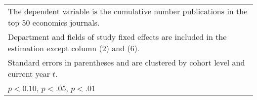\begin{table}[htbp]
\begin{adjustbox}{max width=0.85\textwidth}
\begin{tabular}{l*{8}{c}}
\hline\hline
\multicolumn{9}{l}{\footnotesize The dependent variable is the cumulative number publications in the top 50 economics journals.}\\
\multicolumn{9}{l}{\footnotesize Department and fields of study fixed effects are included in the estimation except column (2) and  (6).}\\
\multicolumn{9}{l}{\footnotesize Standard errors in parentheses and are clustered by cohort level and current year $t$.}\\
\multicolumn{9}{l}{\footnotesize \sym{*} \(p<0.10\), \sym{**} \(p<.05\), \sym{***} \(p<.01\)}\\
\end{tabular}
	\end{adjustbox}
\end{table}